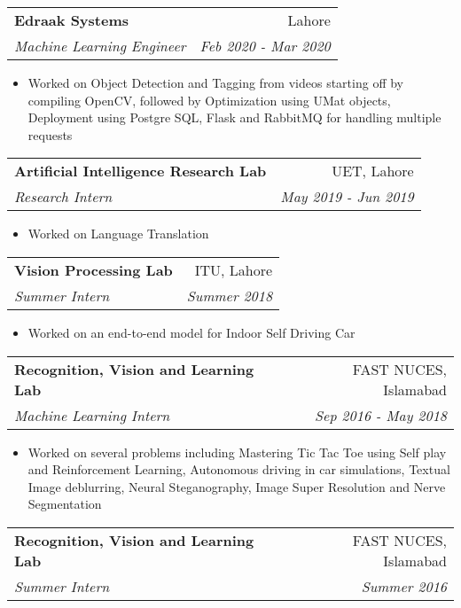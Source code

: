 \documentclass[letterpaper,11pt]{article}
\makeatletter
\newcommand{\resumeSubheading}[4]{
  \vspace{-1pt}\item
    \begin{tabular*}{0.97\textwidth}[t]{l@{\extracolsep{\fill}}r}
      \textbf{#1} & #2 \\
      \textit{\small#3} & \textit{\small #4} \\
    \end{tabular*}\vspace{-5pt}
}
\makeatother
\begin{document}
						\resumeSubheading
      			{Edraak Systems}{Lahore}
      			{Machine Learning Engineer}{Feb 2020 - Mar 2020}
      			
      			\begin{itemize}

					\item Worked on Object Detection and Tagging from videos starting off by compiling OpenCV, followed by Optimization using UMat objects, Deployment using Postgre SQL, Flask and RabbitMQ for handling multiple requests  				
  				
			\end{itemize}
			
			\resumeSubheading
      			{Artificial Intelligence Research Lab}{UET, Lahore}
      			{Research Intern}{May 2019 - Jun 2019}
      
        
          \begin{itemize}
  				\item Worked on Language Translation
			\end{itemize}


           \resumeSubheading
      			{Vision Processing Lab}{ITU, Lahore}
      			{Summer Intern}{Summer 2018}
      
        
          \begin{itemize}
  				\item Worked on an end-to-end model for Indoor Self Driving Car
			\end{itemize}
 
           \resumeSubheading
      {Recognition, Vision and Learning Lab}{FAST NUCES, Islamabad}
      {Machine Learning Intern}{Sep 2016 - May 2018}
         
      
         \begin{itemize}
  				\item Worked on several problems including Mastering Tic Tac Toe using Self play and Reinforcement Learning, Autonomous driving in car
simulations, Textual Image deblurring, Neural Steganography, Image Super Resolution and Nerve Segmentation
  				
			\end{itemize}

     \resumeSubheading
      {Recognition, Vision and Learning Lab}{FAST NUCES, Islamabad}
      {Summer Intern}{Summer 2016}
      
\end{document}
